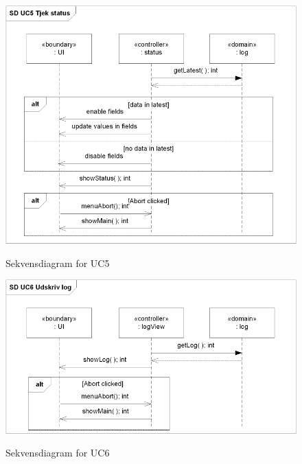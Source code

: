 \begin{figure}[htbp] \centering
{\includegraphics[scale=1]{filer/design/a_uc5}}
\caption{Sekvensdiagram for UC5}
\label{fig:Sekvensdiagram UC5}
\end{figure} 

\begin{figure}[htbp] \centering
{\includegraphics[scale=1]{filer/design/a_uc6}}
\caption{Sekvensdiagram for UC6}
\label{fig:Sekvensdiagram UC6}
\end{figure} 

